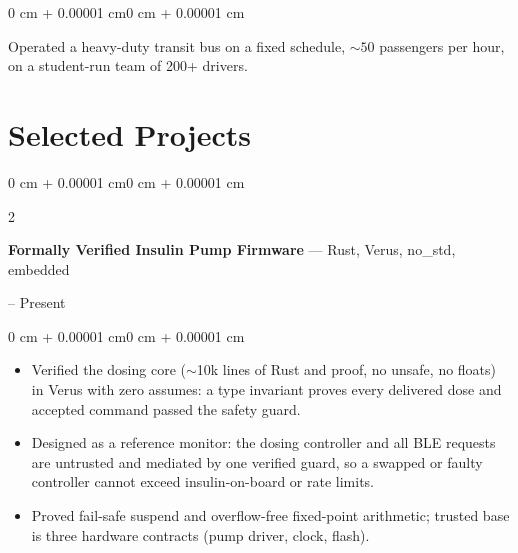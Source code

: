 \documentclass[10pt, letterpaper]{article}
\newenvironment{highlights}{
    \begin{itemize}[
        topsep=0.06 cm,
        parsep=0.04 cm,
        partopsep=0pt,
        itemsep=0pt,
        leftmargin=0 cm + 10pt
    ]
}{
    \end{itemize}
}
\newenvironment{onecolentry}{
    \begin{adjustwidth}{0 cm + 0.00001 cm}{0 cm + 0.00001 cm}
}{
    \end{adjustwidth}
}
\newenvironment{twocolentry}[2][]{
    \onecolentry
    \def\secondColumn{#2}
    \setcolumnwidth{\fill, 6 cm}
    \begin{paracol}{2}
}{
    \switchcolumn \raggedleft \secondColumn
    \end{paracol}
    \endonecolentry
}
\begin{document}
        \vspace{0.06 cm}
        \begin{onecolentry}
            Operated a heavy-duty transit bus on a fixed schedule, ${\sim}50$ passengers per hour,
            on a student-run team of 200+ drivers.
        \end{onecolentry}


    \section{Selected Projects}

        \begin{twocolentry}{
            2026 -- Present
        }
            \textbf{Formally Verified Insulin Pump Firmware} --- Rust, Verus, no\_std, embedded
        \end{twocolentry}

        \vspace{0.10 cm}
        \begin{onecolentry}
            \begin{highlights}
                \item Verified the dosing core ($\sim$10k lines of Rust and proof, no unsafe, no floats) in Verus
                      with zero assumes: a type invariant proves every delivered dose and accepted command
                      passed the safety guard.
                \item Designed as a reference monitor: the dosing controller and all BLE requests are
                      untrusted and mediated by one verified guard, so a swapped or faulty controller cannot
                      exceed insulin-on-board or rate limits.
                \item Proved fail-safe suspend and overflow-free fixed-point arithmetic; trusted base is
                      three hardware contracts (pump driver, clock, flash).
            \end{highlights}
        \end{onecolentry}
\end{document}
